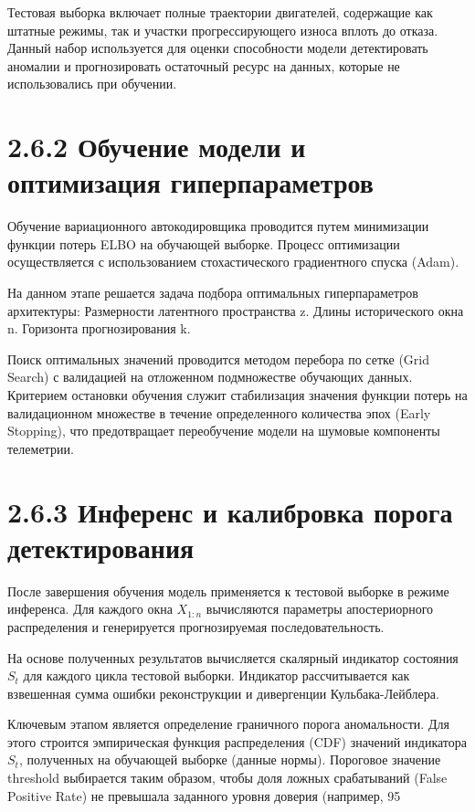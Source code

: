 \documentclass[14pt, a4paper, oneside]{extreport}
\begin{document}
Тестовая выборка включает полные траектории двигателей, содержащие как штатные режимы, так и участки прогрессирующего износа вплоть до отказа. Данный набор используется для оценки способности модели детектировать аномалии и прогнозировать остаточный ресурс на данных, которые не использовались при обучении.

\section{2.6.2 Обучение модели и оптимизация гиперпараметров}

Обучение вариационного автокодировщика проводится путем минимизации функции потерь ELBO на обучающей выборке. Процесс оптимизации осуществляется с использованием стохастического градиентного спуска (Adam).

На данном этапе решается задача подбора оптимальных гиперпараметров архитектуры:
Размерности латентного пространства z.
Длины исторического окна n.
Горизонта прогнозирования k.

Поиск оптимальных значений проводится методом перебора по сетке (Grid Search) с валидацией на отложенном подмножестве обучающих данных. Критерием остановки обучения служит стабилизация значения функции потерь на валидационном множестве в течение определенного количества эпох (Early Stopping), что предотвращает переобучение модели на шумовые компоненты телеметрии.

\section{2.6.3 Инференс и калибровка порога детектирования}

После завершения обучения модель применяется к тестовой выборке в режиме инференса. Для каждого окна $X_{1:n}$ вычисляются параметры апостериорного распределения и генерируется прогнозируемая последовательность.

На основе полученных результатов вычисляется скалярный индикатор состояния $S_t$ для каждого цикла тестовой выборки. Индикатор рассчитывается как взвешенная сумма ошибки реконструкции и дивергенции Кульбака-Лейблера.

Ключевым этапом является определение граничного порога аномальности. Для этого строится эмпирическая функция распределения (CDF) значений индикатора $S_t$, полученных на обучающей выборке (данные нормы). Пороговое значение threshold выбирается таким образом, чтобы доля ложных срабатываний (False Positive Rate) не превышала заданного уровня доверия (например, 95%
\end{document}
